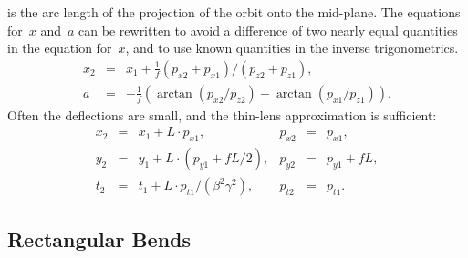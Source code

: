 \documentclass{report}
\begin{document}
is the arc length of the projection of the orbit onto the mid-plane.  
The equations for~$x$ and~$a$ can be rewritten to avoid a difference
of two nearly equal quantities in the equation for~$x$,
and to use known quantities in the inverse trigonometrics.
\begin{equation}
  \begin{array}{lcl}
    x_2&=&x_1+\frac{1}{f} (p_{x2}+p_{x1})/(p_{z2}+p_{z1}),\\
    a&=&-\frac{1}{f}\left(\arctan(p_{x2}/p_{z2})-
      \arctan(p_{x1}/p_{z1})\right).
  \end{array}
\end{equation}
Often the deflections are small, and the thin-lens approximation is
sufficient:
\begin{equation}
  \begin{array}{lcllcl}
    x_2&=&x_1+L\cdot p_{x1}, & p_{x2}&=&p_{x1}, \\
    y_2&=&y_1+L\cdot (p_{y1} + fL/2), & p_{y2}&=&p_{y1} + fL, \\
    t_2&=&t_1+L\cdot p_{t1}/(\beta^2\gamma^2), \quad & p_{t2}&=&p_{t1}.
  \end{array}
\end{equation}


\clearpage
\subsection{Rectangular Bends}
\end{document}
